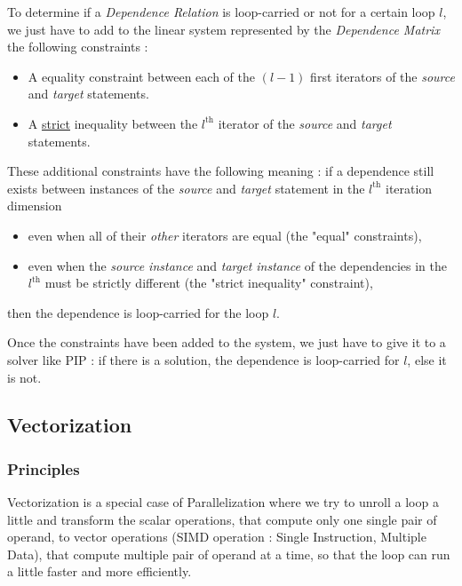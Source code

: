 \documentclass[paper=a4, fontsize=11.5pt]{scrartcl}
\numberwithin{equation}{section}        %
\numberwithin{figure}{section}          %
\numberwithin{table}{section}               %
\begin{document}
        \bigskip

        To determine if a \textit{Dependence Relation} is loop-carried or not for a certain
        loop $l$, we just have to add to the linear system represented by the
        \textit{Dependence Matrix} the following constraints :
        \begin{itemize}
            \item A equality constraint between each of the $(l-1)$ first iterators
                of the \textit{source} and \textit{target} statements.
            \item A \underline{strict} inequality between the $l^{\text{th}}$ iterator of
                the \textit{source} and \textit{target} statements.
        \end{itemize}
        These additional constraints have the following meaning : if a dependence
        still exists between instances of the \textit{source} and \textit{target}
        statement in the $l^\text{th}$ iteration dimension
        \begin{itemize}
            \item even when all of their \textit{other} iterators are equal (the "equal" constraints),
            \item even when the \textit{source instance} and \textit{target instance} of the dependencies
                in the $l^\text{th}$ must be strictly different (the "strict inequality" constraint),
        \end{itemize}
        then the dependence is loop-carried for the loop $l$.

        Once the constraints have been added to the system, we just have to give it to a
        solver like PIP : if there is a solution, the dependence is loop-carried for $l$,
        else it is not.
        
    \subsection{Vectorization}
        \subsubsection{Principles}
        Vectorization is a special case of Parallelization where we try to unroll a loop a
        little and transform the scalar operations, that compute only one single pair of
        operand, to vector operations (SIMD operation : Single Instruction, Multiple Data),
        that compute multiple pair of operand at a time, so that the loop can run a little
        faster and more efficiently.
\end{document}
